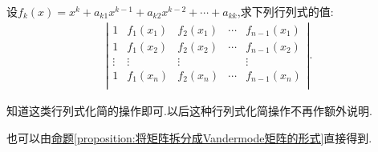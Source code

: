 \documentclass[../../main.tex]{subfiles}
\begin{document}
\begin{corollary}\label{corollary:多项式行列式与Vandermode行列式相关}
设$f_k\left( x \right) =x^k+a_{k1}x^{k-1}+a_{k2}x^{k-2}+\cdots +a_{kk}
$,求下列行列式的值:
\begin{align*}
\left| \begin{matrix}
1&		f_1(x_1)&		f_2(x_1)&		\cdots&		f_{n-1}(x_1)\\
1&		f_1(x_2)&		f_2(x_2)&		\cdots&		f_{n-1}(x_2)\\
\vdots&		\vdots&		\vdots&		&		\vdots\\
1&		f_1(x_n)&		f_2(x_n)&		\cdots&		f_{n-1}(x_n)\\
\end{matrix} \right|.
\end{align*}
\end{corollary}
\begin{note}
知道这类行列式化简的操作即可.以后这种行列式化简操作不再作额外说明.
\end{note}
\begin{remark}
也可以由\hyperref[proposition:将矩阵拆分成Vandermode矩阵的形式]{命题\ref{proposition:将矩阵拆分成Vandermode矩阵的形式}}直接得到.
\end{remark}
\end{document}
